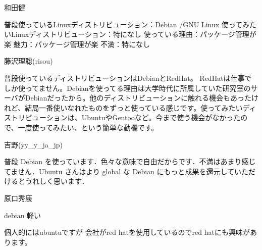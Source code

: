 
\begin{prework}{ 和田健 }

普段使っているLinuxディストリビューション：Debian /GNU Linux
使ってみたいLinuxディストリビューション：特になし
使っている理由：パッケージ管理が楽
魅力：パッケージ管理が楽
不満：特になし


\end{prework}



\begin{prework}{ 藤沢理聡(risou) }

普段使っているディストリビューションはDebianとRedHat。
RedHatは仕事でしか使ってません。Debianを使ってる理由は大学時代に所属していた研究室のサーバがDebianだったから。他のディストリビューションに触れる機会もあったけれど、結局一番使いなれたものをずっと使っている感じです。使ってみたいディストリビューションは、UbuntuやGentooなど。今まで使う機会がなかったので、一度使ってみたい、という簡単な動機です。

\end{prework}



\begin{prework}{ 吉野(yy\_y\_ja\_jp) }

普段 Debian を使っています．色々な意味で自由だからです．不満はあまり感じてません．Ubuntu さんはより global な Debian にもっと成果を還元していただけるとうれしく思います．

\end{prework}



\begin{prework}{ 原口秀康 }

debian
軽い

個人的にはubuntuですが
会社がred hatを使用しているのでred hatにも興味があります。

\end{prework}



